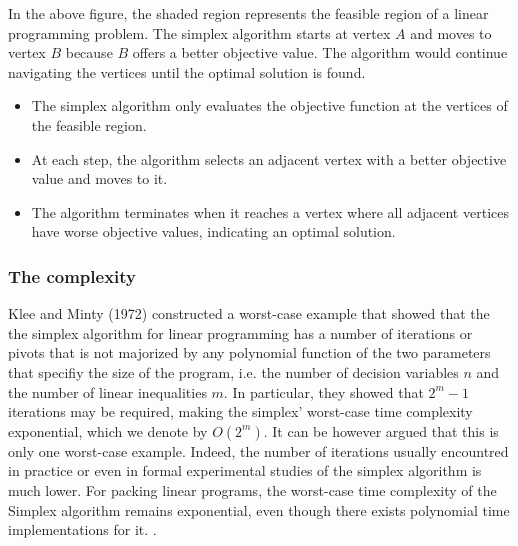 In the above figure, the shaded region represents
the feasible region of a linear programming problem.
The simplex algorithm starts at vertex \(A\) and moves to
vertex \(B\) because \(B\) offers a better objective value.
The algorithm would continue navigating the vertices until
the optimal solution is found.
\begin{itemize}
    \item The simplex algorithm only evaluates the objective
          function at the vertices of the feasible region.
    \item At each step, the algorithm selects an adjacent
          vertex with a better objective value and moves to it.
    \item The algorithm terminates when it reaches a vertex where
          all adjacent vertices have worse objective values, indicating an
          optimal solution.
\end{itemize}
\subsubsection{The complexity}
Klee and Minty (1972) \parencite{klee1972good} constructed a worst-case example that 
showed that the
the simplex algorithm for linear programming has a number of iterations or pivots that 
is not majorized by any polynomial function of the two parameters that specifiy the size of
the program, i.e. the number of  decision variables $n$ and the number of linear inequalities $m$.
 In particular, they showed that $2^m -1$ iterations may be required, making the simplex'
worst-case time complexity exponential, which we denote by \( O(2^m) \).
It can be however argued that this is only one worst-case example. Indeed, the number 
of iterations usually encountred in practice or even in formal experimental studies of 
the simplex algorithm is much lower.
For packing linear programs, the worst-case time complexity of the Simplex algorithm
remains exponential, even though there exists polynomial time implementations for it.
\parencite{stille2010solution}.

